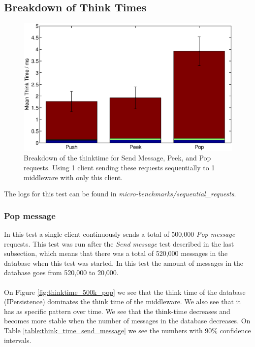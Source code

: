 \documentclass{article}
\begin{document}
        \subsection{Breakdown of Think Times}
            \begin{figure}[H]
                    \centering
                    \centerline{\includegraphics[scale=0.50]{thinktime_push_peek_pop}}
                    \caption{Breakdown of the thinktime for Send Message, Peek, and Pop requests. Using 1 client sending these requests sequentially to 1 middleware with only this client.}
                    \label{fig:thinktime_push_peek_pop}
             \end{figure}

        The logs for this test can be found in \textit{micro-benchmarks/sequential\_requests}.

            \subsubsection{Pop message}
                In this test a single client continuously sends a total of 500,000 \textit{Pop message} requests. This test was run after the \textit{Send message} test described in the last subsection, which means that there was a total of 520,000 messages in the database when this test was started. In this test the amount of messages in the database goes from 520,000 to 20,000.\\
                \\
                On Figure \ref{fig:thinktime_500k_pop} we see that the think time of the database (IPersistence) dominates the think time of the middleware. We also see that it has as specific pattern over time. We see that the think-time decreases and becomes more stable when the number of messages in the database decreases. On Table \ref{table:think_time_send_message} we see the numbers with 90\% confidence intervals.
\end{document}
